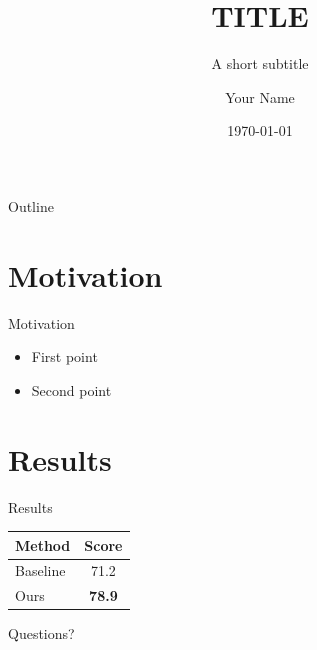 \documentclass[aspectratio=169]{beamer}
\title{{{TITLE}}}
\subtitle{A short subtitle}
\author{Your Name}
\institute{Your Institution}
\date{\today}
\begin{document}
\maketitle

\begin{frame}{Outline}
  \tableofcontents
\end{frame}

\section{Motivation}
\begin{frame}{Motivation}
  \begin{itemize}
    \item First point
    \item Second point
  \end{itemize}
\end{frame}

\section{Results}
\begin{frame}{Results}
  \centering
  \begin{tabular}{lc}
    \toprule
    Method & Score \\
    \midrule
    Baseline & 71.2 \\
    Ours & \textbf{78.9} \\
    \bottomrule
  \end{tabular}
\end{frame}

\begin{frame}[standout]
  Questions?
\end{frame}
\end{document}
